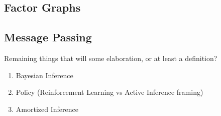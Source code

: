\documentclass[onecolumn]{IEEEtran}
\begin{document}

\subsection{Factor Graphs}

\subsection{Message Passing}



Remaining things that will some elaboration, or at least a definition?

\begin{enumerate}
	\item Bayesian Inference
	\item Policy (Reinforcement Learning vs Active Inference framing)
	\item Amortized Inference
\end{enumerate}


\printbibliography
\end{document}
